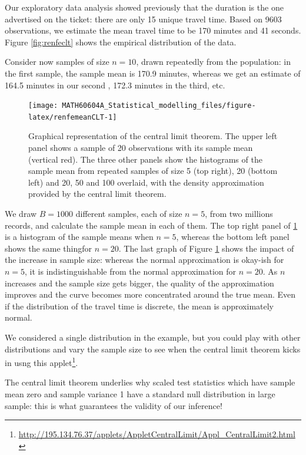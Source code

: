 \documentclass[
  11pt,
  letterpaper,
]{book}
\renewcommand{\href}[2]{#2\footnote{\url{#1}}}
\theoremstyle{definition}
\theoremstyle{definition}
\theoremstyle{definition}
\theoremstyle{definition}
\theoremstyle{remark}
\begin{document}
Our exploratory data analysis showed previously that the duration is the one advertised on the ticket: there are only 15 unique travel time. Based on 9603 observations, we estimate the mean travel time to be 170 minutes and 41 seconds. Figure \ref{fig:renfeclt} shows the empirical distribution of the data.

Consider now samples of size \(n=10\), drawn repeatedly from the population: in the first sample, the sample mean is 170.9 minutes, whereas we get an estimate of 164.5 minutes in our second , 172.3 minutes in the third, etc.

\begin{figure}

{\centering \texttt{[image: MATH60604A\_Statistical\_modelling\_files/figure-latex/renfemeanCLT-1]} 

}

\caption{Graphical representation of the central limit theorem. The upper left panel shows a sample of 20 observations with its sample mean (vertical red). The three other panels show the histograms of the sample mean from repeated samples of size 5 (top right), 20 (bottom left) and 20, 50 and 100 overlaid, with the density approximation provided by the central limit theorem.}\label{fig:renfemeanCLT}
\end{figure}

We draw \(B=1000\) different samples, each of size \(n=5\), from two millions records, and calculate the sample mean in each of them. The top right panel of \ref{fig:renfemeanCLT} is a histogram of the sample means when \(n=5\), whereas the bottom left panel shows the same thingfor \(n=20\). The last graph of Figure \ref{fig:renfemeanCLT} shows the impact of the increase in sample size: whereas the normal approximation is okay-ish for \(n=5\), it is indistinguishable from the normal approximation for \(n=20\). As \(n\) increases and the sample size gets bigger, the quality of the approximation improves and the curve becomes more concentrated around the true mean. Even if the distribution of the travel time is discrete, the mean is approximately normal.

We considered a single distribution in the example, but you could play with other distributions and vary the sample size to see when the central limit theorem kicks in usng this \href{http://195.134.76.37/applets/AppletCentralLimit/Appl_CentralLimit2.html}{applet}.

The central limit theorem underlies why scaled test statistics which have sample mean zero and sample variance 1 have a standard null distribution in large sample: this is what guarantees the validity of our inference!
\end{document}
